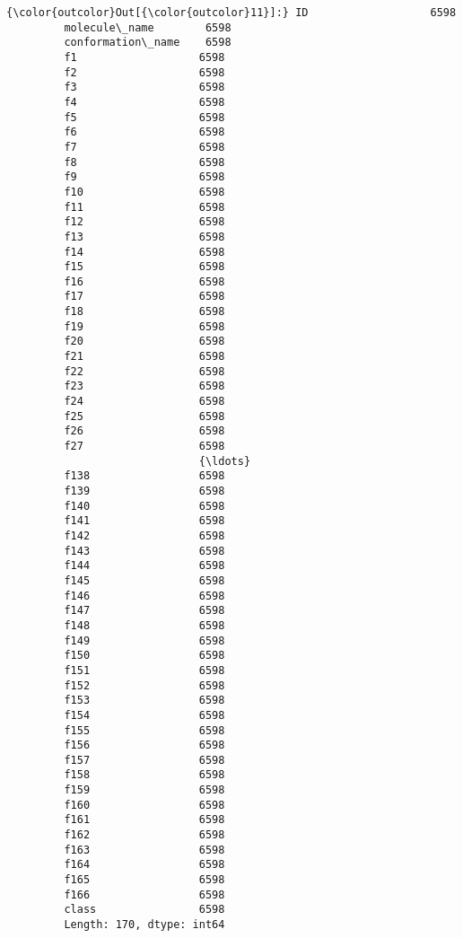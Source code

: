 \documentclass[11pt]{article}
\begin{document}
\begin{Verbatim}[commandchars=\\\{\}]
{\color{outcolor}Out[{\color{outcolor}11}]:} ID                   6598
         molecule\_name        6598
         conformation\_name    6598
         f1                   6598
         f2                   6598
         f3                   6598
         f4                   6598
         f5                   6598
         f6                   6598
         f7                   6598
         f8                   6598
         f9                   6598
         f10                  6598
         f11                  6598
         f12                  6598
         f13                  6598
         f14                  6598
         f15                  6598
         f16                  6598
         f17                  6598
         f18                  6598
         f19                  6598
         f20                  6598
         f21                  6598
         f22                  6598
         f23                  6598
         f24                  6598
         f25                  6598
         f26                  6598
         f27                  6598
                              {\ldots} 
         f138                 6598
         f139                 6598
         f140                 6598
         f141                 6598
         f142                 6598
         f143                 6598
         f144                 6598
         f145                 6598
         f146                 6598
         f147                 6598
         f148                 6598
         f149                 6598
         f150                 6598
         f151                 6598
         f152                 6598
         f153                 6598
         f154                 6598
         f155                 6598
         f156                 6598
         f157                 6598
         f158                 6598
         f159                 6598
         f160                 6598
         f161                 6598
         f162                 6598
         f163                 6598
         f164                 6598
         f165                 6598
         f166                 6598
         class                6598
         Length: 170, dtype: int64
\end{Verbatim}
            

    
    
    
    
\end{document}
